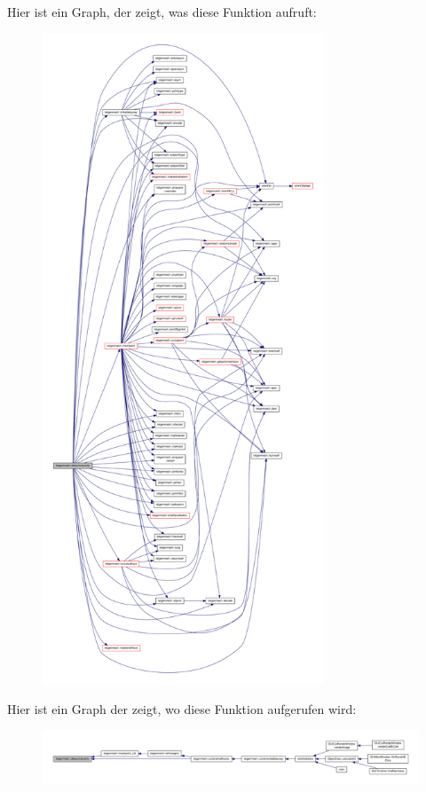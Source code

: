 Hier ist ein Graph, der zeigt, was diese Funktion aufruft\-:
\nopagebreak
\begin{figure}[H]
\begin{center}
\leavevmode
\includegraphics[height=550pt]{classtetgenmesh_ab1a82368937a13996efae911b8b1fded_cgraph}
\end{center}
\end{figure}




Hier ist ein Graph der zeigt, wo diese Funktion aufgerufen wird\-:
\nopagebreak
\begin{figure}[H]
\begin{center}
\leavevmode
\includegraphics[width=350pt]{classtetgenmesh_ab1a82368937a13996efae911b8b1fded_icgraph}
\end{center}
\end{figure}


